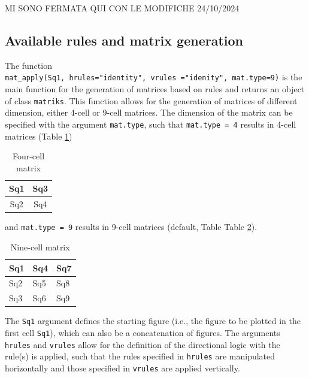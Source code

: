 MI SONO FERMATA QUI CON LE MODIFICHE 24/10/2024

\subsection{Available rules and matrix generation}\label{available-rules-and-matrix-generation}

The function \texttt{mat\_apply(Sq1,\ hrules="identity",\ vrules\ ="idenity",\ mat.type=9)} is the main function for the generation of matrices based on rules and returns an object of class \texttt{matriks}.
This function allows for the generation of matrices of different dimension, either 4-cell or 9-cell matrices.
The dimension of the matrix can be specified with the argument \texttt{mat.type}, such that \texttt{mat.type\ =\ 4} results in 4-cell matrices (Table \ref{tab:fourCell-static})

\begin{table}

\caption{\label{tab:fourCell-static}Four-cell matrix}
\centering
\begin{tabular}[t]{c|c}
\hline
Sq1 & Sq3\\
\hline
Sq2 & Sq4\\
\hline
\end{tabular}
\end{table}

and \texttt{mat.type\ =\ 9} results in 9-cell matrices (default, Table Table \ref{tab:nineCell-static}).

\begin{table}

\caption{\label{tab:nineCell-static}Nine-cell matrix}
\centering
\begin{tabular}[t]{l|l|l}
\hline
Sq1 & Sq4 & Sq7\\
\hline
Sq2 & Sq5 & Sq8\\
\hline
Sq3 & Sq6 & Sq9\\
\hline
\end{tabular}
\end{table}

The \texttt{Sq1} argument defines the starting figure (i.e., the figure to be plotted in the first cell \texttt{Sq1}), which can also be a concatenation of figures. The arguments \texttt{hrules} and \texttt{vrules} allow for the definition of the directional logic with the rule(s) is applied, such that the rules specified in \texttt{hrules} are manipulated horizontally and those specified in \texttt{vrules} are applied vertically.

